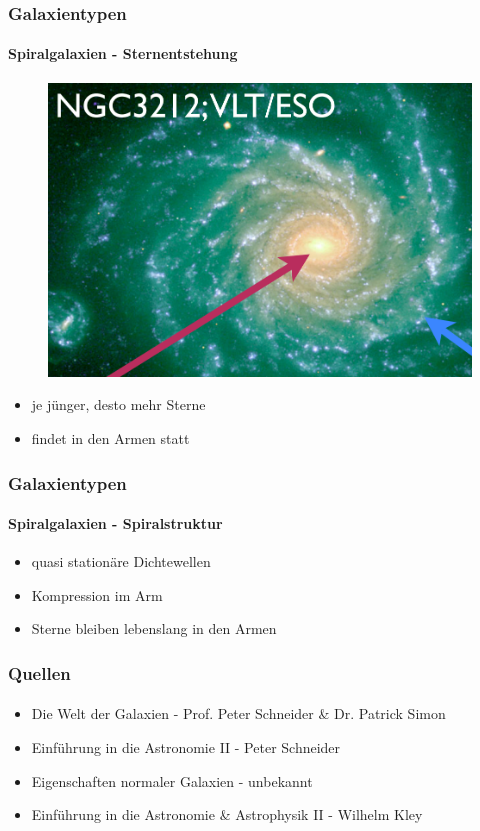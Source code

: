 \begin{frame}
\frametitle{Galaxientypen}
\framesubtitle{Spiralgalaxien - Sternentstehung}

\begin{figure}
\includegraphics[scale=0.25]{Sternentstehung_Spirale.png}
\end{figure}

\begin{itemize}
\item je jünger, desto mehr Sterne
\item findet in den Armen statt
\end{itemize}

\end{frame}


\begin{frame}
\frametitle{Galaxientypen}
\framesubtitle{Spiralgalaxien - Spiralstruktur}


\begin{itemize}
\item quasi stationäre Dichtewellen 
\item Kompression im Arm
\item Sterne bleiben lebenslang in den Armen
\end{itemize}

\end{frame}


\begin{frame}
\frametitle{Quellen}
\framesubtitle{ }


\begin{itemize}
\item Die Welt der Galaxien - Prof. Peter Schneider \& Dr. Patrick Simon
\item Einführung in die Astronomie II - Peter Schneider
\item Eigenschaften normaler Galaxien - unbekannt
\item Einführung in die Astronomie \& Astrophysik II - Wilhelm Kley
\end{itemize}

\end{frame}



